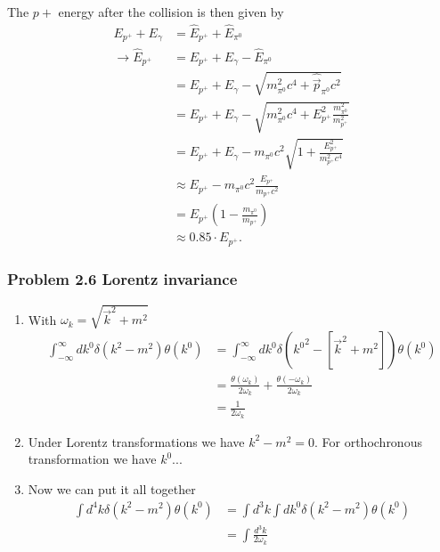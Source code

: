 \documentclass[10pt,a4paper]{article}
\theoremstyle{definition}
\begin{document}
\begin{enumerate}
    The $p+$ energy after the collision is then given by 
    \begin{align}
        E_{p^+}+E_\gamma&=\hat E_{p^+}+\hat E_{\pi^0}\\
        \rightarrow\hat E_{p^+}&=E_{p^+}+E_\gamma - \hat E_{\pi^0}\\
        &=E_{p^+}+E_\gamma - \sqrt{m_{\pi^0}^2c^4+\hat{\vec{p}}_{\pi^0}c^2}\\
        &=E_{p^+}+E_\gamma - \sqrt{m_{\pi^0}^2c^4+E_{p^+}^2\frac{m_{\pi^0}^2}{m_{p^+}^2}}\\
        &=E_{p^+}+E_\gamma - m_{\pi^0}c^2\sqrt{1+\frac{E_{p^+}^2}{m_{p^+}^2c^4}}\\
        &\approx E_{p^+} - m_{\pi^0}c^2\frac{E_{p^+}}{m_{p^+}c^2}\\
        &=E_{p^+}\left(1-\frac{m_{\pi^0}}{m_{p^+}}\right)\\
        &\approx0.85\cdot E_{p^+}.
    \end{align}
\end{enumerate}

\subsubsection{Problem 2.6 Lorentz invariance}
\begin{enumerate}
    \item With $\omega_k=\sqrt{\vec{k}^2+m^2}$
    \begin{align}
        \int_{-\infty}^\infty dk^0\delta(k^2-m^2)\theta(k^0)
        &=\int_{-\infty}^\infty dk^0\delta({k^0}^2-[\vec{k}^2+m^2])\theta(k^0)\\
        &=\frac{\theta(\omega_k)}{2\omega_k}+\frac{\theta(-\omega_k)}{2\omega_k}\\
        &=\frac{1}{2\omega_k}
    \end{align}
    \item Under Lorentz transformations we have $k^2-m^2=0$. For orthochronous transformation we have $k^0 ...$
    \item Now we can put it all together
    \begin{align}
        \int d^4k\delta(k^2-m^2)\theta(k^0)
        &=\int d^3k\int dk^0\delta(k^2-m^2)\theta(k^0)\\
        &=\int\frac{d^3k}{2\omega_k}
    \end{align}
\end{enumerate}
\end{document}
